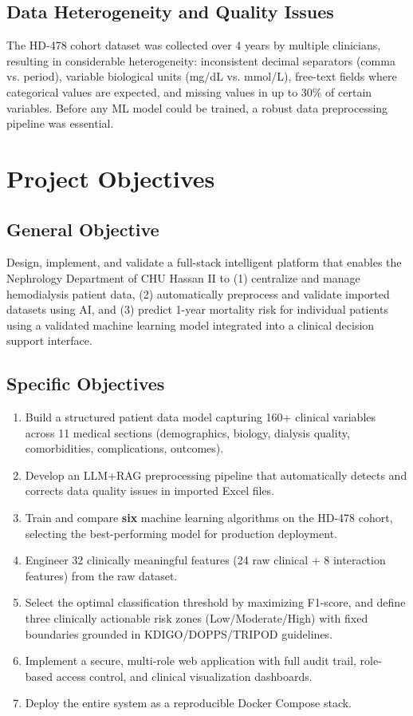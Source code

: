 \documentclass[12pt,a4paper,twoside]{report}
\begin{document}
\subsection{Data Heterogeneity and Quality Issues}

The HD-478 cohort dataset was collected over 4 years by multiple clinicians, resulting in considerable heterogeneity: inconsistent decimal separators (comma vs. period), variable biological units (mg/dL vs. mmol/L), free-text fields where categorical values are expected, and missing values in up to 30\% of certain variables. Before any ML model could be trained, a robust data preprocessing pipeline was essential.

\section{Project Objectives}\label{sec:objectives}

\subsection{General Objective}

Design, implement, and validate a full-stack intelligent platform that enables the Nephrology Department of CHU Hassan II to (1) centralize and manage hemodialysis patient data, (2) automatically preprocess and validate imported datasets using AI, and (3) predict 1-year mortality risk for individual patients using a validated machine learning model integrated into a clinical decision support interface.

\subsection{Specific Objectives}

\begin{enumerate}
  \item Build a structured patient data model capturing 160+ clinical variables across 11 medical sections (demographics, biology, dialysis quality, comorbidities, complications, outcomes).
  \item Develop an LLM+RAG preprocessing pipeline that automatically detects and corrects data quality issues in imported Excel files.
  \item Train and compare \textbf{six} machine learning algorithms on the HD-478 cohort, selecting the best-performing model for production deployment.
  \item Engineer 32 clinically meaningful features (24 raw clinical + 8 interaction features) from the raw dataset.
  \item Select the optimal classification threshold by maximizing F1-score, and define three clinically actionable risk zones (Low/Moderate/High) with fixed boundaries grounded in KDIGO/DOPPS/TRIPOD guidelines.
  \item Implement a secure, multi-role web application with full audit trail, role-based access control, and clinical visualization dashboards.
  \item Deploy the entire system as a reproducible Docker Compose stack.
\end{enumerate}
\end{document}
